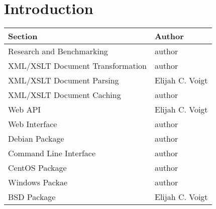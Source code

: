 \section{Introduction}

\begin{center}
    \begin{tabular}{ | l | p{10cm} |}
    \hline
    Section & Author \\ \hline
    Research and Benchmarking & author \\ \hline
    XML/XSLT Document Transformation & author \\ \hline
    XML/XSLT Document Parsing & Elijah C. Voigt \\ \hline
    XML/XSLT Document Caching & author \\ \hline
    Web API & Elijah C. Voigt\\ \hline
    Web Interface & author \\ \hline
    Debian Package & author \\ \hline
    Command Line Interface& author \\ \hline
    CentOS Package & author \\ \hline
    Windows Packae & author \\ \hline
    BSD Package & Elijah C. Voigt \\ \hline
    \end{tabular}
\end{center}

\tableofcontents

\newpage

\clearpage




\newpage
